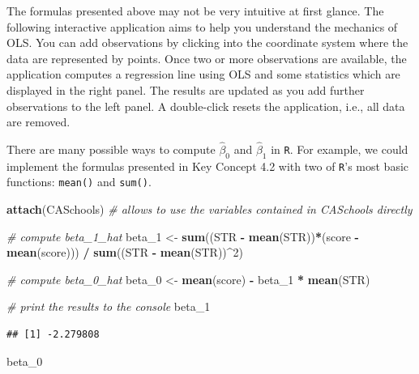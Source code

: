 \documentclass[]{book}
\newenvironment{Shaded}{\begin{snugshade}}{\end{snugshade}}
\newcommand{\KeywordTok}[1]{\textcolor[rgb]{0.13,0.29,0.53}{\textbf{#1}}}
\newcommand{\DecValTok}[1]{\textcolor[rgb]{0.00,0.00,0.81}{#1}}
\newcommand{\StringTok}[1]{\textcolor[rgb]{0.31,0.60,0.02}{#1}}
\newcommand{\CommentTok}[1]{\textcolor[rgb]{0.56,0.35,0.01}{\textit{#1}}}
\newcommand{\OperatorTok}[1]{\textcolor[rgb]{0.81,0.36,0.00}{\textbf{#1}}}
\newcommand{\NormalTok}[1]{#1}
\theoremstyle{definition}
\theoremstyle{definition}
\theoremstyle{definition}
\theoremstyle{remark}
\begin{document}
The formulas presented above may not be very intuitive at first glance.
The following interactive application aims to help you understand the
mechanics of OLS. You can add observations by clicking into the
coordinate system where the data are represented by points. Once two or
more observations are available, the application computes a regression
line using OLS and some statistics which are displayed in the right
panel. The results are updated as you add further observations to the
left panel. A double-click resets the application, i.e., all data are
removed.

There are many possible ways to compute \(\hat{\beta}_0\) and
\(\hat{\beta}_1\) in \texttt{R}. For example, we could implement the
formulas presented in Key Concept 4.2 with two of \texttt{R}'s most
basic functions: \texttt{mean()} and \texttt{sum()}.

\begin{Shaded}
\begin{Highlighting}[]
\KeywordTok{attach}\NormalTok{(CASchools) }\CommentTok{# allows to use the variables contained in CASchools directly}

\CommentTok{# compute beta_1_hat}
\NormalTok{beta_}\DecValTok{1}\NormalTok{ <-}\StringTok{ }\KeywordTok{sum}\NormalTok{((STR }\OperatorTok{-}\StringTok{ }\KeywordTok{mean}\NormalTok{(STR))}\OperatorTok{*}\NormalTok{(score }\OperatorTok{-}\StringTok{ }\KeywordTok{mean}\NormalTok{(score))) }\OperatorTok{/}\StringTok{ }\KeywordTok{sum}\NormalTok{((STR }\OperatorTok{-}\StringTok{ }\KeywordTok{mean}\NormalTok{(STR))}\OperatorTok{^}\DecValTok{2}\NormalTok{)}

\CommentTok{# compute beta_0_hat}
\NormalTok{beta_}\DecValTok{0}\NormalTok{ <-}\StringTok{ }\KeywordTok{mean}\NormalTok{(score) }\OperatorTok{-}\StringTok{ }\NormalTok{beta_}\DecValTok{1} \OperatorTok{*}\StringTok{ }\KeywordTok{mean}\NormalTok{(STR)}

\CommentTok{# print the results to the console}
\NormalTok{beta_}\DecValTok{1}
\end{Highlighting}
\end{Shaded}

\begin{verbatim}
## [1] -2.279808
\end{verbatim}

\begin{Shaded}
\begin{Highlighting}[]
\NormalTok{beta_}\DecValTok{0}
\end{Highlighting}
\end{Shaded}
\end{document}
